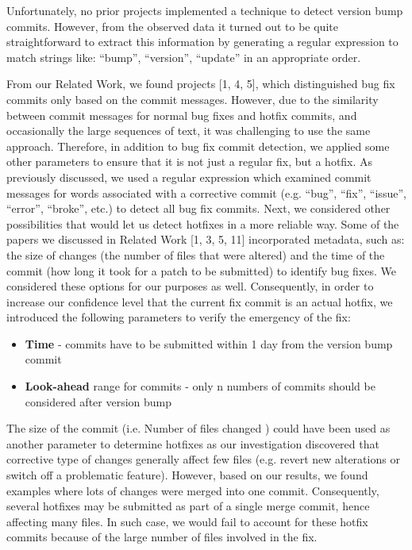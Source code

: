 Unfortunately, no prior projects implemented a technique to detect version bump commits. However, from the observed data it turned out to be quite straightforward to extract this information by generating a regular expression to match strings like: “bump”, “version”, “update” in an appropriate order.\par

From our Related Work, we found projects [1, 4, 5], which distinguished bug fix commits only based on the commit messages. However, due to the similarity between commit messages for normal bug fixes and hotfix commits, and occasionally the large sequences of text, it was challenging to use the same approach. Therefore, in addition to bug fix commit detection, we applied some other parameters to ensure that it is not just a regular fix, but a hotfix. As previously discussed, we used a regular expression which examined commit messages for words associated with a corrective commit (e.g. “bug”, “fix”, “issue”, “error”, “broke”, etc.) to detect all bug fix commits. Next, we considered other possibilities that would let us detect hotfixes in a more reliable way. Some of the papers we discussed in Related Work [1, 3, 5, 11] incorporated metadata, such as: the size of changes (the number of files that were altered) and the time of the commit (how long it took for a patch to be submitted) to identify bug fixes. We considered these options for our purposes as well. Consequently, in order to increase our confidence level that the current fix commit is an actual hotfix, we introduced the following parameters to verify the emergency of the fix:
\begin{itemize}
  \item \textbf{Time} - commits have to be submitted within 1 day from the version bump commit
  \item \textbf{Look-ahead} range for commits - only n numbers of commits should be considered after version bump
\end{itemize}

\par
The size of the commit (i.e. Number of files changed ) could have been used as another parameter to determine hotfixes as our investigation discovered that corrective type of changes generally affect few files (e.g. revert new alterations or switch off a problematic feature). However, based on our results, we found examples where lots of changes were merged into one commit. Consequently, several hotfixes may be submitted as part of a single merge commit, hence affecting many files. In such case, we would fail to account for these hotfix commits because of the large number of files involved in the fix.\par

